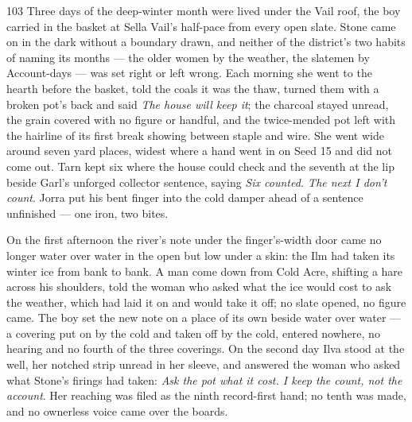 
\scenebreak


\scenebreak


\scenebreak

\CRtailpiece
\begin{CRchronicle}{103}
Three days of the deep-winter month were lived under the Vail roof, the boy carried in the basket at Sella Vail’s half-pace from every open slate. Stone came on in the dark without a boundary drawn, and neither of the district’s two habits of naming its months --- the older women by the weather, the slatemen by Account-days --- was set right or left wrong. Each morning she went to the hearth before the basket, told the coals it was the thaw, turned them with a broken pot’s back and said \emph{The house will keep it}; the charcoal stayed unread, the grain covered with no figure or handful, and the twice-mended pot left with the hairline of its first break showing between staple and wire. She went wide around seven yard places, widest where a hand went in on Seed 15 and did not come out. Tarn kept six where the house could check and the seventh at the lip beside Garl’s unforged collector sentence, saying \emph{Six counted. The next I don’t count}. Jorra put his bent finger into the cold damper ahead of a sentence unfinished --- one iron, two bites.

On the first afternoon the river’s note under the finger’s-width door came no longer water over water in the open but low under a skin: the Ilm had taken its winter ice from bank to bank. A man come down from Cold Acre, shifting a hare across his shoulders, told the woman who asked what the ice would cost to ask the weather, which had laid it on and would take it off; no slate opened, no figure came. The boy set the new note on a place of its own beside water over water --- a covering put on by the cold and taken off by the cold, entered nowhere, no hearing and no fourth of the three coverings. On the second day Ilva stood at the well, her notched strip unread in her sleeve, and answered the woman who asked what Stone’s firings had taken: \emph{Ask the pot what it cost. I keep the count, not the account}. Her reaching was filed as the ninth record-first hand; no tenth was made, and no ownerless voice came over the boards.


\end{CRchronicle}
